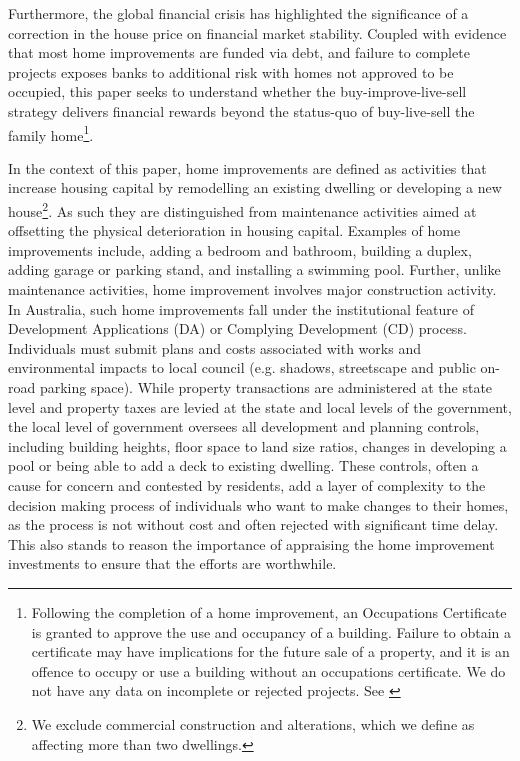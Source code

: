 \documentclass[AEJ,reqno, draftmode]{AEA} %
\begin{document}
Furthermore, the global financial crisis has highlighted the significance of a correction in the house price on financial market stability. Coupled with evidence that most home improvements are funded via debt, and failure to complete projects exposes banks to additional risk with homes not approved to be occupied, this paper seeks to understand whether the buy-improve-live-sell strategy delivers financial rewards beyond the status-quo of buy-live-sell the family home\footnote{Following the completion of a home improvement, an Occupations Certificate is granted to approve the use and occupancy of a building. Failure to obtain a certificate may have implications for the future sale of a property, and it is an offence to occupy or use a building without an occupations certificate. We do not have any data on incomplete or rejected projects. See \citet{fair}}.

In the context of this paper, home improvements are defined as activities that increase housing capital by remodelling an existing dwelling or developing a new house\footnote{We exclude commercial construction and alterations, which we define as affecting more than two dwellings.}. As such they are distinguished from maintenance activities aimed at offsetting the physical deterioration in housing capital. Examples of home improvements include, adding a bedroom and bathroom, building a duplex, adding garage or parking stand, and installing a swimming pool. Further, unlike maintenance activities, home improvement involves major construction activity. In Australia, such home improvements fall under the institutional feature of Development Applications (DA) or Complying Development (CD) process. Individuals must submit plans and costs associated with works and environmental impacts to local council (e.g. shadows, streetscape and public on-road parking space). While property transactions are administered at the state level and property taxes are levied at the state and local levels of the government, the local level of government oversees all development and planning controls, including building heights, floor space to land size ratios, changes in developing a pool or being able to add a deck to existing dwelling. These controls, often a cause for concern and contested by residents, add a layer of complexity to the decision making process of individuals who want to make changes to their homes, as the process is not without cost and often rejected with significant time delay. This also stands to reason the importance of appraising the home improvement investments to ensure that the efforts are worthwhile.
\end{document}
